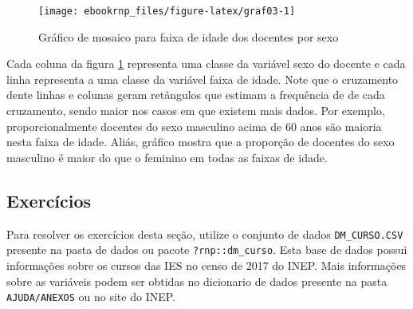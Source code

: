 \documentclass[12pt,]{style/krantz}
\theoremstyle{definition}
\theoremstyle{definition}
\theoremstyle{definition}
\theoremstyle{remark}
\begin{document}
\begin{figure}[H]

{\centering \texttt{[image: ebookrnp\_files/figure-latex/graf03-1]} 

}

\caption{Gráfico de mosaico para faixa de idade dos docentes por sexo}\label{fig:graf03}
\end{figure}

Cada coluna da figura \ref{fig:graf03} representa uma classe da variável
sexo do docente e cada linha representa a uma classe da variável faixa
de idade. Note que o cruzamento dente linhas e colunas geram retângulos
que estimam a frequência de de cada cruzamento, sendo maior nos casos em
que existem mais dados. Por exemplo, proporcionalmente docentes do sexo
masculino acima de 60 anos são maioria nesta faixa de idade. Aliás,
gráfico mostra que a proporção de docentes do sexo masculino é maior do
que o feminino em todas as faixas de idade.

\subsection{Exercícios}\label{exercicios}

Para resolver os exercícios desta seção, utilize o conjunto de dados
\texttt{DM\_CURSO.CSV} presente na pasta de dados ou pacote
\texttt{?rnp::dm\_curso}. Esta base de dados possui informações sobre os
cursos das IES no censo de 2017 do INEP. Mais informações sobre as
variáveis podem ser obtidas no dicionario de dados presente na pasta
\texttt{AJUDA/ANEXOS} ou no site do INEP.
\end{document}
